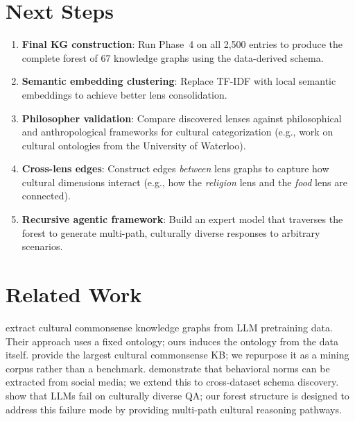\documentclass[11pt]{article}
\begin{document}
\section{Next Steps}
\label{sec:next}

\begin{enumerate}
  \item \textbf{Final KG construction}: Run Phase~4 on all 2,500 entries
  to produce the complete forest of 67 knowledge graphs using the
  data-derived schema.
  \item \textbf{Semantic embedding clustering}: Replace TF-IDF with
  local semantic embeddings to achieve better lens consolidation.
  \item \textbf{Philosopher validation}: Compare discovered lenses against
  philosophical and anthropological frameworks for cultural categorization
  (e.g., work on cultural ontologies from the University of Waterloo).
  \item \textbf{Cross-lens edges}: Construct edges \emph{between} lens
  graphs to capture how cultural dimensions interact (e.g., how the
  \emph{religion} lens and the \emph{food} lens are connected).
  \item \textbf{Recursive agentic framework}: Build an expert model that
  traverses the forest to generate multi-path, culturally diverse responses
  to arbitrary scenarios.
\end{enumerate}

\section{Related Work}
\label{sec:related}

\citet{tonga2026llms} extract cultural commonsense knowledge graphs from
LLM pretraining data. Their approach uses a fixed ontology; ours induces
the ontology from the data itself.
\citet{nguyen2023candle} provide the largest cultural commonsense KB;
we repurpose it as a mining corpus rather than a benchmark.
\citet{shi2024culturebank} demonstrate that behavioral norms can be
extracted from social media; we extend this to cross-dataset schema
discovery.
\citet{myung2024blend} show that LLMs fail on culturally diverse QA;
our forest structure is designed to address this failure mode by
providing multi-path cultural reasoning pathways.


\end{document}
